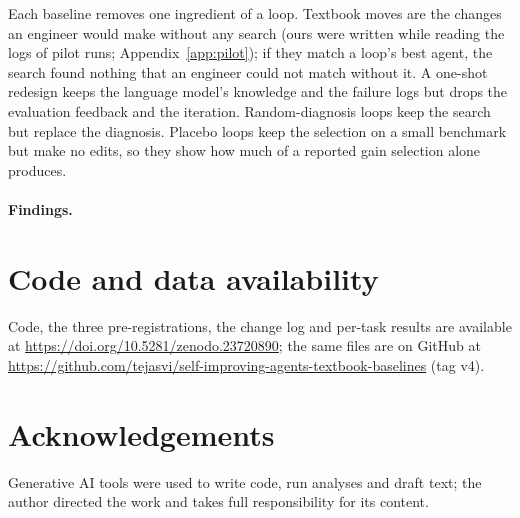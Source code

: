 \documentclass[11pt]{article}
\begin{document}
Each baseline removes one ingredient of a loop. Textbook moves are the changes an engineer would make without any
search (ours were written while reading the logs of pilot runs; Appendix~\ref{app:pilot}); if they match a loop's best agent, the search found nothing that an engineer could not match without it. A one-shot
redesign keeps the language model's knowledge and the failure logs but drops the evaluation feedback and the iteration.
Random-diagnosis loops keep the search but replace the diagnosis. Placebo loops keep the selection on a small benchmark
but make no edits, so they show how much of a reported gain selection alone produces.

\paragraph{Findings.} 









\clearpage
\section*{Code and data availability}
Code, the three pre-registrations, the change log and per-task results are available at
\url{https://doi.org/10.5281/zenodo.23720890}; the same files are on GitHub at
\url{https://github.com/tejasvi/self-improving-agents-textbook-baselines} (tag v4).

\section*{Acknowledgements}
Generative AI tools were used to write code, run analyses and draft text; the author directed the work and takes full responsibility for its content.




\clearpage
\appendix

\end{document}
